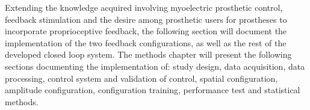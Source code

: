 

Extending the knowledge acquired involving myoelectric prosthetic control, feedback stimulation and the desire among prosthetic users for prostheses to incorporate proprioceptive feedback, the following section will document the implementation of the two feedback configurations, as well as the rest of the developed closed loop system. The methods chapter will present the following sections documenting the implementation of: study design, data acquisition, data processing, control system and validation of control, spatial configuration, amplitude configuration, configuration training, performance test and statistical methods.      